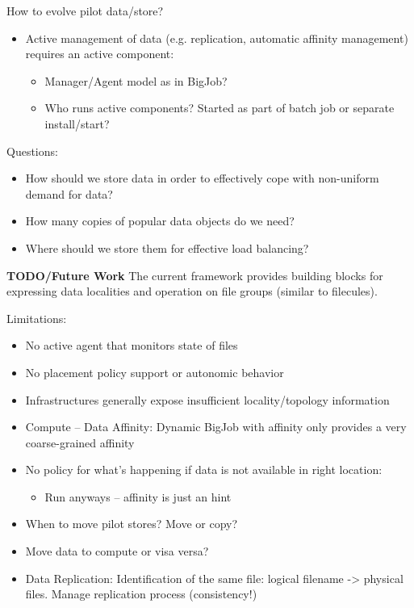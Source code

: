 \documentclass[conference,final]{IEEEtran}
\begin{document}
How to evolve pilot data/store?
\begin{itemize}
	\item Active management of data (e.g. replication, automatic affinity management) requires an active component:
	\begin{itemize}
		\item Manager/Agent model as in BigJob?
		\item Who runs active components? Started as part of batch job or separate install/start?
	\end{itemize}
\end{itemize}

Questions:
\begin{itemize}
    \item How should
    we store data in order to effectively cope with non-uniform demand for
    data? 
    \item How many copies of popular data objects do we need? 
    \item Where should we store them for effective load balancing?
\end{itemize}

\textbf{TODO/Future Work}
The current framework provides building blocks for expressing data localities and operation on file groups (similar to filecules).

Limitations:
\begin{itemize}
    \item No active agent that monitors state of files
    \item No placement policy support or autonomic behavior
    \item Infrastructures generally expose insufficient locality/topology information
    \item Compute – Data Affinity: Dynamic BigJob with affinity only provides a very coarse-grained affinity
    \item No policy for what’s happening if data is not available in right location:
    \begin{itemize}
        \item Run anyways – affinity is just an hint
    \end{itemize}
    \item When to move pilot stores? Move or copy?
    \item Move data to compute or visa versa?
    \item Data Replication: Identification of the same file: logical filename -> physical files. Manage replication process (consistency!)
\end{itemize}
\end{document}
